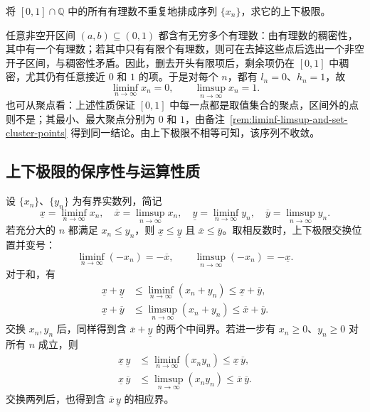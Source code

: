 \begin{example}
将 $[0,1]\cap\mathbb{Q}$ 中的所有有理数不重复地排成序列 $\{x_n\}$，求它的上下极限。
\end{example}

\begin{solve}
任意非空开区间 $(a,b)\subseteq(0,1)$ 都含有无穷多个有理数：由有理数的稠密性，其中有一个有理数；若其中只有有限个有理数，则可在去掉这些点后选出一个非空开子区间，与稠密性矛盾。因此，删去开头有限项后，剩余项仍在 $[0,1]$ 中稠密，尤其仍有任意接近 $0$ 和 $1$ 的项。于是对每个 $n$，都有 $l_n=0$、$h_n=1$，故
\[
    \liminf_{n\to\infty}x_n=0,
    \qquad \limsup_{n\to\infty}x_n=1.
\]
也可从聚点看：上述性质保证 $[0,1]$ 中每一点都是取值集合的聚点，区间外的点则不是；其最小、最大聚点分别为 $0$ 和 $1$，由备注~\ref{rem:liminf-limsup-and-set-cluster-points} 得到同一结论。由上下极限不相等可知，该序列不收敛。
\end{solve}

\subsection{上下极限的保序性与运算性质}
\label{subsec:liminf-limsup-operations}

\begin{theorem}
\label{thm:liminf-limsup-operations}
设 $\{x_n\}$、$\{y_n\}$ 为有界实数列，简记
\[
    \underline x=\liminf_{n\to\infty}x_n,\quad
    \overline x=\limsup_{n\to\infty}x_n,\quad
    \underline y=\liminf_{n\to\infty}y_n,\quad
    \overline y=\limsup_{n\to\infty}y_n.
\]
若充分大的 $n$ 都满足 $x_n\leq y_n$，则 $\underline x\leq\underline y$ 且 $\overline x\leq\overline y$。取相反数时，上下极限交换位置并变号：
\begin{equation}
    \liminf_{n\to\infty}(-x_n)=-\overline x,
    \qquad \limsup_{n\to\infty}(-x_n)=-\underline x.
    \label{eq:liminf-limsup-negation}
\end{equation}
对于和，有
\begin{equation}
    \begin{aligned}
        \underline x+\underline y
        &\leq\liminf_{n\to\infty}(x_n+y_n)
        \leq\underline x+\overline y,\\
        \underline x+\overline y
        &\leq\limsup_{n\to\infty}(x_n+y_n)
        \leq\overline x+\overline y.
    \end{aligned}
    \label{eq:liminf-limsup-sum}
\end{equation}
交换 $x_n,y_n$ 后，同样得到含 $\overline x+\underline y$ 的两个中间界。若进一步有 $x_n\geq0$、$y_n\geq0$ 对所有 $n$ 成立，则
\begin{equation}
    \begin{aligned}
        \underline x\,\underline y
        &\leq\liminf_{n\to\infty}(x_ny_n)
        \leq\underline x\,\overline y,\\
        \underline x\,\overline y
        &\leq\limsup_{n\to\infty}(x_ny_n)
        \leq\overline x\,\overline y.
    \end{aligned}
    \label{eq:liminf-limsup-product}
\end{equation}
交换两列后，也得到含 $\overline x\,\underline y$ 的相应界。
\end{theorem}

